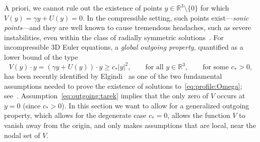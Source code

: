 \documentclass[11pt,reqno]{amsproc}
\numberwithin{equation}{section}
\theoremstyle{remark}
\begin{document}
A priori, we cannot rule out the existence of points $y \in \mathbb{R}^3 \setminus\{ 0 \}$ for which $V(y) = \gamma y + U(y) = 0$. 
In the compressible setting, such points exist---\textit{sonic points}---and they are well known to cause tremendous headaches, such as severe instabilities, even within the class of radially symmetric solutions~\cite{Guderley42,MRRS22a,BCG25}.
For incompressible 3D Euler equations, a 
\textit{global outgoing property}, quantified as a lower bound of the type 
\begin{equation}
\label{eq:outgoing:tarek}
V(y)\cdot y = (\gamma y + U(y) ) \cdot y \geq c_* |y|^2, 
\qquad
\mbox{for all }   y \in \mathbb{R}^3,
\qquad
\mbox{for some }
c_* > 0,
\end{equation}
has been recently identified by Elgindi~\cite{Elgindi25} as one of the two fundamental assumptions  needed to prove the existence of solutions to~\eqref{eq:profile:Omega}; see~\cite[Hypothesis 6.7]{Elgindi25}. Assumption~\eqref{eq:outgoing:tarek} implies that the only zero of $V$ occurs at $y=0$ (since $c_*>0$). In this section we want to allow for a generalized outgoing property, which allows for the degenerate case $c_* = 0$, allows the function $V$ to vanish away from the origin, and only makes assumptions that are local, near the nodal set of $V$.
\end{document}
